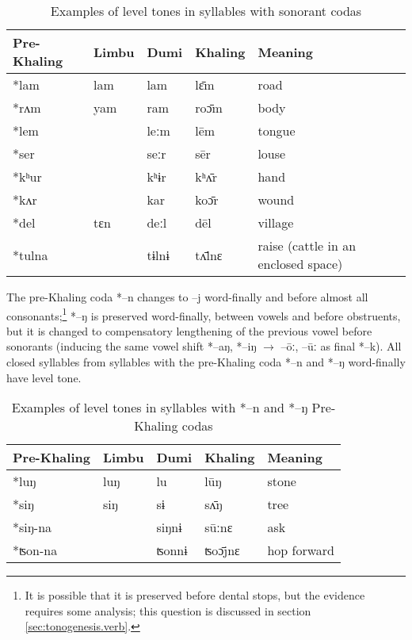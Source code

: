 \documentclass[oldfontcommands,oneside,a4paper,11pt]{article}
\newcommand{\ipa}[1]{{\phon \mbox{#1}}} %
\begin{document}
\begin{table}[H]
\caption{Examples of level tones in syllables with sonorant codas} \centering
\begin{tabular}{lllll}
\toprule
Pre-Khaling	&Limbu	&Dumi	&Khaling	&Meaning\\
\midrule
\ipa{*lam}	&\ipa{lam} & \ipa{lam}	 & \ipa{lɛ̄m}	& road  \\
\ipa{*rʌm}	&\ipa{yam} & \ipa{ram}	 & \ipa{roɔ̄m}	& body  \\
\ipa{*lem} & & \ipa{leːm}	 & \ipa{lēm}	& tongue  \\
\midrule
\ipa{*ser} & & \ipa{seːr}	 & \ipa{sēr}	& louse  \\
\ipa{*kʰur}	&  & \ipa{kʰɨr}	 & \ipa{kʰʌ̄r}	& hand  \\
\ipa{*kʌr}	&  &\ipa{kar}	 & \ipa{koɔ̄r}	& wound  \\
\midrule
 \ipa{*del}	&\ipa{tɛn} & \ipa{deːl}	 & \ipa{dēl}	& village  \\
 \ipa{*tulna}	&  & \ipa{tɨlnɨ}	 & \ipa{tʌ̄lnɛ}	& raise (cattle in an enclosed space)  \\
\bottomrule
\end{tabular}
\end{table}

The  pre-Khaling coda *--n changes to \ipa{--j} word-finally and before almost all consonants;\footnote{It is possible that it is preserved before dental stops, but the evidence requires some analysis; this question is discussed in section \ref{sec:tonogenesis.verb}.} *--ŋ is preserved word-finally, between vowels and before obstruents, but it is changed to compensatory lengthening of the previous vowel before sonorants (inducing the same vowel shift *--aŋ, *--iŋ $\rightarrow$ \ipa{--ōː}, \ipa{--ūː} as final *--k). All closed syllables from syllables with the pre-Khaling coda *--n and *--ŋ word-finally have level tone.
\begin{table}[H]
\caption{Examples of level tones in syllables with *--n and *--ŋ Pre-Khaling codas} \centering
\begin{tabular}{lllll}
\toprule
Pre-Khaling	&Limbu	&Dumi	&Khaling	&Meaning\\
\midrule
\ipa{*luŋ}	&\ipa{luŋ} & \ipa{lu}	 & \ipa{lūŋ}	& stone  \\
\ipa{*siŋ}	&\ipa{siŋ} & \ipa{sɨ}	 & \ipa{sʌ̄ŋ}	& tree  \\
\ipa{*siŋ-na}	&  & \ipa{siŋnɨ}	 & \ipa{sūːnɛ}	& ask  \\
\ipa{*ʦon-na}	&  & \ipa{ʦonnɨ}	 & \ipa{ʦoɔ̄jnɛ}	& hop forward  \\

\bottomrule
\end{tabular}
\end{table}
\end{document}
